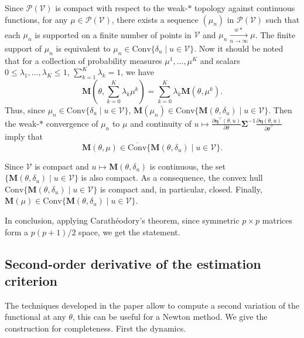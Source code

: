 \documentclass[twocolumn]{autart}
\theoremstyle{definition}
\theoremstyle{remark}
\newcommand{\Conv}{\mathrm{Conv}}
\newcommand{\V}{\mathcal{V}}
\renewcommand{\P}{\mathcal{P}}
\newcommand{\Mb}{\mathbf{M}}
\newcommand{\etab}{\boldsymbol{\eta}}
\newcommand{\Sigmab}{\boldsymbol{\Sigma}}
\begin{document}
\begin{pf}
Since $\P(\V)$ is compact with respect to the weak-$*$ topology against continuous functions, for any $\mu\in \P(\V)$, there exists a sequence $(\mu_n)$ in $\P(\V)$ such that each $\mu_n$  is supported on a finite number of points in $\V$ and $\mu_n\xrightarrow[n\to\infty]{w*}\mu$. The finite support of  $\mu_n$ is equivalent to $\mu_n\in \Conv \{\delta_u\mid u\in \V\}$. Now it should be noted that for a collection  of probability measures $\mu^1,\dots, \mu^K$ and scalars $0\leq \lambda_1,\dots ,\lambda_K\leq 1$, $\sum_{k=1}^K\lambda_k=1$, we have 
$$
\Mb\left(\theta,\sum_{k=0}^K \lambda_k\mu^k\right)=\sum_{k=0}^K \lambda_k \Mb\left(\theta,\mu^k\right).
$$
Thus, since $\mu_n\in \Conv \{\delta_u\mid u\in \V\}$, $\Mb(\mu_n)\in\Conv \{\Mb(\theta,\delta_u)\mid u\in \V\}$. Then the weak-$*$ convergence of $\mu_n$ to $\mu$ and continuity of $u\mapsto \frac{\partial\etab^\top(\theta,u)}{\partial\theta}
\Sigmab^{-1} \frac{\partial\etab(\theta,u)}{\partial\theta^\top}$ imply that 
$$
\Mb(\theta,\mu)\in \overline{\Conv}\{\Mb(\theta,\delta_u)\mid u\in \V\}.
$$ 

Since $\V$ is compact and $u\mapsto \Mb(\theta,\delta_u)$ is continuous, the set  $\{\Mb(\theta,\delta_u)\mid u\in \V\}$ is also compact. As a consequence, the convex hull $\Conv \{\Mb(\theta,\delta_u)\mid u\in \V\}$ is compact and, in particular, closed. Finally, $\Mb(\mu)\in \Conv\{\Mb(\theta,\delta_u)\mid u\in \V\}$.

In conclusion, applying Carathéodory's theorem, since symmetric $p\times p$ matrices form a $p(p+1)/2$ space, we get the statement.
\end{pf}




\subsection{Second-order derivative of the estimation criterion}
The techniques developed in the paper allow to compute a second variation of the functional at any $\theta$, this can be useful for a Newton method. We give the construction for completeness. First the dynamics.
\end{document}

